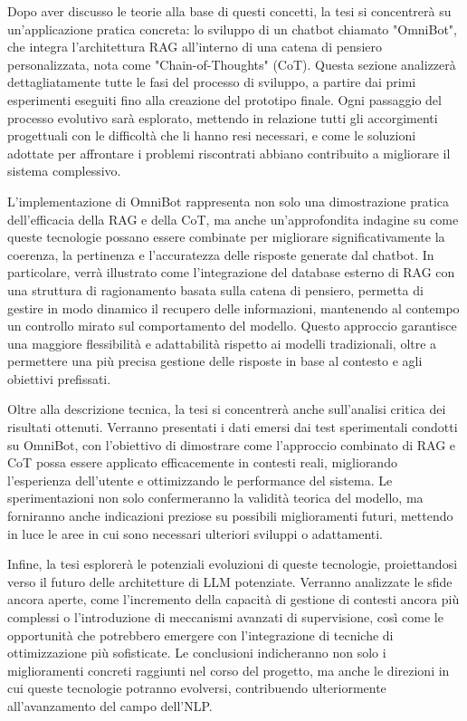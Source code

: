 Dopo aver discusso le teorie alla base di questi concetti, la tesi si concentrerà su un'applicazione pratica concreta: lo sviluppo di un chatbot chiamato "OmniBot", che integra l'architettura RAG all'interno di una catena di pensiero personalizzata, nota come "Chain-of-Thoughts" (CoT). Questa sezione analizzerà dettagliatamente tutte le fasi del processo di sviluppo, a partire dai primi esperimenti eseguiti fino alla creazione del prototipo finale. Ogni passaggio del processo evolutivo sarà esplorato, mettendo in relazione tutti gli accorgimenti progettuali con le difficoltà che li hanno resi necessari, e come le soluzioni adottate per affrontare i problemi riscontrati abbiano contribuito a migliorare il sistema complessivo.

L'implementazione di OmniBot rappresenta non solo una dimostrazione pratica dell'efficacia della RAG e della CoT, ma anche un'approfondita indagine su come queste tecnologie possano essere combinate per migliorare significativamente la coerenza, la pertinenza e l'accuratezza delle risposte generate dal chatbot. In particolare, verrà illustrato come l'integrazione del database esterno di RAG con una struttura di ragionamento basata sulla catena di pensiero, permetta di gestire in modo dinamico il recupero delle informazioni, mantenendo al contempo un controllo mirato sul comportamento del modello. Questo approccio garantisce una maggiore flessibilità e adattabilità rispetto ai modelli tradizionali, oltre a permettere una più precisa gestione delle risposte in base al contesto e agli obiettivi prefissati.

Oltre alla descrizione tecnica, la tesi si concentrerà anche sull'analisi critica dei risultati ottenuti. Verranno presentati i dati emersi dai test sperimentali condotti su OmniBot, con l'obiettivo di dimostrare come l'approccio combinato di RAG e CoT possa essere applicato efficacemente in contesti reali, migliorando l'esperienza dell'utente e ottimizzando le performance del sistema. Le sperimentazioni non solo confermeranno la validità teorica del modello, ma forniranno anche indicazioni preziose su possibili miglioramenti futuri, mettendo in luce le aree in cui sono necessari ulteriori sviluppi o adattamenti.

Infine, la tesi esplorerà le potenziali evoluzioni di queste tecnologie, proiettandosi verso il futuro delle architetture di LLM potenziate. Verranno analizzate le sfide ancora aperte, come l'incremento della capacità di gestione di contesti ancora più complessi o l'introduzione di meccanismi avanzati di supervisione, così come le opportunità che potrebbero emergere con l'integrazione di tecniche di ottimizzazione più sofisticate. Le conclusioni indicheranno non solo i miglioramenti concreti raggiunti nel corso del progetto, ma anche le direzioni in cui queste tecnologie potranno evolversi, contribuendo ulteriormente all'avanzamento del campo dell'NLP.